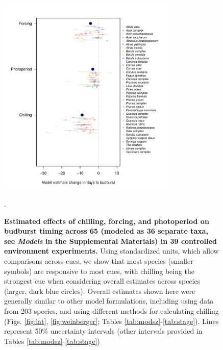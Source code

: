 \documentclass{article}
\newcommand{\R}[1]{\label{#1}\linelabel{#1}}
\begin{document}
\begin{figure}[h!]
\centering
\noindent \includegraphics[width=0.75\textwidth]{..//..//analyses/bb_analysis/figures/muplotspcompexprampfputah_z.pdf}
\caption{\textbf{Estimated effects of chilling, forcing, and photoperiod on budburst timing across 65 (modeled as 36 separate taxa, see \emph{Models} in the Supplemental Materials) in 39 controlled environment experiments\R{ee12}.} Using standardized units, which allow comparisons across cues, we show that most species (smaller symbols) are responsive to most cues, with chilling being the strongest cue when considering overall estimates across species (larger, dark blue circles). Overall estimates shown here were generally similar to other model formulations, including using data from 203 species, and using different methods for calculating chilling (Figs. \ref{fig:lat}, \ref{fig:weinberger}; Tables \ref{tab:modsz}-\ref{tab:stage}). Lines represent 50\% uncertainty intervals (other intervals provided in Tables \ref{tab:modsz}-\ref{tab:stage})}. %
\label{fig:mu}
\end{figure}

\newpage
\end{document}
